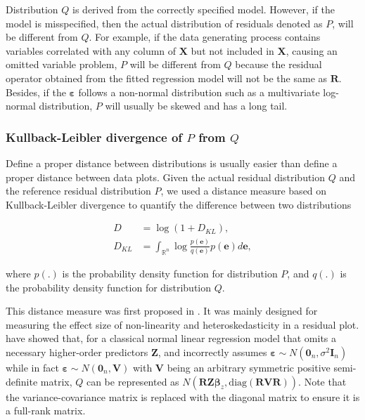 \documentclass[]{interact}
\theoremstyle{plain}%
\theoremstyle{definition}
\theoremstyle{remark}
\begin{document}
Distribution \(Q\) is derived from the correctly specified model.
However, if the model is misspecified, then the actual distribution of
residuals denoted as \(P\), will be different from \(Q\). For example,
if the data generating process contains variables correlated with any
column of \(\boldsymbol{X}\) but not included in \(\boldsymbol{X}\),
causing an omitted variable problem, \(P\) will be different from \(Q\)
because the residual operator obtained from the fitted regression model
will not be the same as \(\boldsymbol{R}\). Besides, if the
\(\boldsymbol{\varepsilon}\) follows a non-normal distribution such as a
multivariate log-normal distribution, \(P\) will usually be skewed and
has a long tail.

\hypertarget{kullback-leibler-divergence-of-p-from-q}{%
\subsubsection{\texorpdfstring{Kullback-Leibler divergence of \(P\) from
\(Q\)}{Kullback-Leibler divergence of P from Q}}\label{kullback-leibler-divergence-of-p-from-q}}

Define a proper distance between distributions is usually easier than
define a proper distance between data plots. Given the actual residual
distribution \(Q\) and the reference residual distribution \(P\), we
used a distance measure based on Kullback-Leibler divergence
\citep{kullback1951information} to quantify the difference between two
distributions

\begin{align}
\label{eq:kl-0}
D &= \log\left(1 + D_{KL}\right), \\
\label{eq:kl-1}
D_{KL} &= \int_{\mathbb{R}^{n}}\log\frac{p(\boldsymbol{e})}{q(\boldsymbol{e})}p(\boldsymbol{e})d\boldsymbol{e},
\end{align}

\noindent where \(p(.)\) is the probability density function for
distribution \(P\), and \(q(.)\) is the probability density function for
distribution \(Q\).

This distance measure was first proposed in \citet{li2023plot}. It was
mainly designed for measuring the effect size of non-linearity and
heteroskedasticity in a residual plot. \citet{li2023plot} have showed
that, for a classical normal linear regression model that omits a
necessary higher-order predictors \(\boldsymbol{Z}\), and incorrectly
assumes
\(\boldsymbol{\varepsilon} \sim N(\boldsymbol{0}_n,\sigma^2\boldsymbol{I}_n)\)
while in fact
\(\boldsymbol{\varepsilon} \sim N(\boldsymbol{0}_n, \boldsymbol{V})\)
with \(\boldsymbol{V}\) being an arbitrary symmetric positive
semi-definite matrix, \(Q\) can be represented as
\(N(\boldsymbol{R}\boldsymbol{Z}\boldsymbol{\beta}_z, \text{diag}(\boldsymbol{R}\boldsymbol{V}\boldsymbol{R}))\).
Note that the variance-covariance matrix is replaced with the diagonal
matrix to ensure it is a full-rank matrix.
\end{document}
